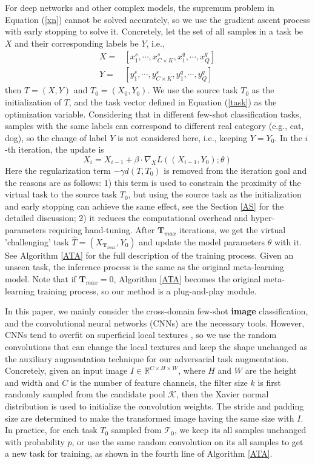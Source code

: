 \documentclass{article}
\begin{document}
For deep networks and other complex models, the supremum problem in Equation (\ref{xn}) cannot be solved accurately, so we use the gradient ascent process with early stopping to solve it. Concretely, let the set of all samples in a task be $X$ and their corresponding labels be $Y$, i.e.,
\begin{align}
  X= & [x_1^s,\cdots,x_{C\times K}^s,x_1^q,\cdots,x_{Q}^q] \\
  Y= & [y_1^s,\cdots,y_{C\times K}^s,y_1^q,\cdots,y_{Q}^q]
\end{align}
then $T=(X,Y)$ and $T_0=(X_0,Y_0)$. We use the source task $T_0$ as the initialization of $T$, and the task vector defined in Equation (\ref{task}) as the optimization variable. Considering that in different few-shot classification tasks, samples with the same labels can correspond to different real category (e.g., cat, dog), so the change of label $Y$ is not considered here, i.e., keeping $Y=Y_0$. In the $i$-th iteration, the update is
\begin{equation}
    X_i=X_{i-1}+\beta\cdot\nabla_XL((X_{i-1},Y_0);\theta)
\end{equation}
Here the regularization term $-\gamma d(T,T_0)$ is removed from the iteration goal and the reasons are as follows: 1) this term is used to constrain the proximity of the virtual task to the source task $T_0$, but using the source task as the initialization and early stopping can achieve the same effect, see the Section \ref{AS} for the detailed discussion; 2) it reduces the computational overhead and hyper-parameters requiring hand-tuning. After $\mathbf{T}_{max}$ iterations, we get the virtual 'challenging' task $\hat{T}=(X_{\mathbf{T}_{max}},Y_0)$ and update the model parameters $\theta$ with it. See Algorithm \ref{ATA} for the full description of the training process. Given an unseen task, the inference process is the same as the original meta-learning model. Note that if $\mathbf{T}_{max}=0$, Algorithm \ref{ATA} becomes the original meta-learning training process, so our method is a plug-and-play module.

In this paper, we mainly consider the cross-domain few-shot \textbf{image} classification, and the convolutional neural networks (CNNs) are the necessary tools. However, CNNs tend to overfit on superficial local textures \cite{DBLP:conf/iclr/GeirhosRMBWB19}, so we use the random convolutions \cite{DBLP:conf/iclr/LeeLSL20} that can change the local textures and keep the shape unchanged as the auxiliary augmentation technique for our adversarial task augmentation. Concretely, given an input image $I\in\mathbb{R}^{C\times H\times W}$, where $H$ and $W$ are the height and width and $C$ is the number of feature channels, the filter size $k$ is first randomly sampled from the candidate pool $\mathcal{K}$, then the Xavier normal distribution \cite{glorot2010understanding} is used to initialize the convolution weights. The stride and padding size are determined to make the transformed image having the same size with $I$. In practice, for each task $T_0$ sampled from $\mathcal{T}_0$, we keep its all samples unchanged with probability $p$, or use the same random convolution on its all samples to get a new task for training, as shown in the fourth line of Algorithm \ref{ATA}.
\end{document}
